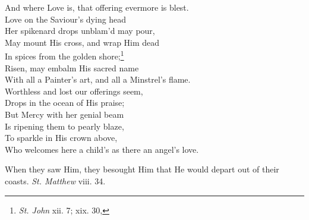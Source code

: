  And where Love is, that offering evermore is blest. \\
  Love on the Saviour’s dying head \\
 Her spikenard drops unblam’d may pour, \\
 May mount His cross, and wrap Him dead \\
 In spices from the golden shore;\footnote{\emph{St. John} xii. 7; xix. 30,} \\
 Risen, may embalm His sacred name \\
 With all a Painter’s art, and all a Minstrel’s flame. \\
  Worthless and lost our offerings seem, \\
 Drops in the ocean of His praise; \\
 But Mercy with her genial beam \\
 Is ripening them to pearly blaze, \\
 To sparkle in His crown above, \\
 Who welcomes here a child’s as there an angel’s love.\\


When they saw Him, they besought Him that He would depart out of their coasts. \emph{St. Matthew} viii. 34.

